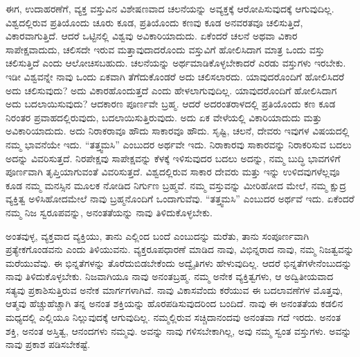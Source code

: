 ಈಗ, ಉದಾಹರಣೆಗೆ, ವ್ಯಕ್ತ ವಸ್ತುವಿನ ವಿಶೇಷಣವಾದ ಚಲನೆಯನ್ನು ಅವ್ಯಕ್ತಕ್ಕೆ ಆರೋಪಿಸುವುದಕ್ಕೆ ಆಗುವುದಿಲ್ಲ. ವಿಶ್ವದಲ್ಲಿರುವ ಪ್ರತಿಯೊಂದು ಚೂರು ಕೂಡ, ಪ್ರತಿಯೊಂದು ಕಣವು ಕೂಡ ಅನವರತವೂ ಚಲಿಸುತ್ತಿದೆ, ವಿಕಾರವಾಗುತ್ತಿದೆ. ಆದರೆ ಒಟ್ಟಿನಲ್ಲಿ ವಿಶ್ವವು ಅವಿಕಾರಿಯಾದುದು. ಏಕೆಂದರೆ ಚಲನೆ ಅಥವಾ ವಿಕಾರ ಸಾಪೇಕ್ಷವಾದುದು, ಚಲಿಸದೇ ಇರುವ ಮತ್ತಾವುದಾದರೊಂದು ವಸ್ತುವಿಗೆ ಹೋಲಿಸಿದಾಗ ಮಾತ್ರ ಒಂದು ವಸ್ತು ಚಲಿಸುತ್ತಿದೆ ಎಂದು ಆಲೋಚಿಸಬಹುದು. ಚಲನೆಯನ್ನು ಅರ್ಥಮಾಡಿಕೊಳ್ಳಬೇಕಾದರೆ ಎರಡು ವಸ್ತುಗಳು ಇರಬೇಕು. ಇಡೀ ವಿಶ್ವವನ್ನೇ ನಾವು ಒಂದು ಏಕವಾಗಿ ತೆಗೆದುಕೊಂಡರೆ ಅದು ಚಲಿಸಲಾರದು. ಯಾವುದರೊಂದಿಗೆ ಹೋಲಿಸಿದರೆ ಅದು ಚಲಿಸುವುದು? ಅದು ವಿಕಾರಹೊಂದುತ್ತದೆ ಎಂದು ಹೇಳಲಾಗುವುದಿಲ್ಲ. ಯಾವುದರೊಂದಿಗೆ ಹೋಲಿಸಿದಾಗ ಅದು ಬದಲಾಯಿಸುವುದು? ಆದಕಾರಣ ಪೂರ್ಣವೇ ಬ್ರಹ್ಮ. ಆದರೆ ಅದರಂತರಾಳದಲ್ಲಿ ಪ್ರತಿಯೊಂದು ಕಣ ಕೂಡ ನಿರಂತರ ಪ್ರವಾಹದಲ್ಲಿರುವುದು, ಬದಲಾಯಿಸುತ್ತಿರುವುದು. ಅದು ಏಕ ವೇಳೆಯಲ್ಲಿ ವಿಕಾರಿಯಾದುದು ಮತ್ತು ಅವಿಕಾರಿಯಾದುದು. ಅದು ನಿರಾಕರಾವೂ ಹೌದು ಸಾಕಾರವೂ ಹೌದು. ಸೃಷ್ಟಿ, ಚಲನೆ, ದೇವರು ಇವುಗಳ ವಿಷಯದಲ್ಲಿ ನಮ್ಮ ಭಾವನೆಯೇ ಇದು. “ತತ್ತ್ವಮಸಿ” ಎಂಬುದರ ಅರ್ಥವೇ ಇದು. ನಿರಾಕಾರವು ಸಾಕಾರವನ್ನು ನಿರಾಕರಿಸುವ ಬದಲು ಅದನ್ನು ವಿವರಿಸುತ್ತದೆ. ನಿರಪೇಕ್ಷವು ಸಾಪೇಕ್ಷವನ್ನು ಕೆಳಕ್ಕೆ ಇಳಿಸುವುದರ ಬದಲು ಅದನ್ನು, ನಮ್ಮ ಬುದ್ಧಿ ಭಾವಗಳಿಗೆ ಪೂರ್ಣವಾಗಿ ತೃಪ್ತಿಯಾಗುವಂತೆ ವಿವರಿಸುತ್ತದೆ. ವಿಶ್ವದಲ್ಲಿರುವ ಸಾಕಾರ ದೇವರು ಮತ್ತು ಇನ್ನು ಉಳಿದವುಗಳೆಲ್ಲವೂ ಕೂಡ ನಮ್ಮ ಮನಸ್ಸಿನ ಮೂಲಕ ನೋಡಿದ ನಿರ್ಗುಣ ಬ್ರಹ್ಮವೆ. ನಮ್ಮ ವಸ್ತುವನ್ನು ಮೀರಿಹೋದ ಮೇಲೆ, ನಮ್ಮ ಕ್ಷುದ್ರ ವ್ಯಕ್ತಿತ್ವ ಅಳಿಸಿಹೋದಮೇಲೆ ನಾವು ಬ್ರಹ್ಮನೊಂದಿಗೆ ಒಂದಾಗುವೆವು. “ತತ್ತ್ವಮಸಿ” ಎಂಬುದರ ಅರ್ಥವೆ ಇದು. ಏಕೆಂದರೆ ನಮ್ಮ ನಿಜ ಸ್ವರೂಪವನ್ನು, ಅನಂತತೆಯನ್ನು ನಾವು ತಿಳಿದುಕೊಳ್ಳಬೇಕು. 

ಅಂತವುಳ್ಳ, ವ್ಯಕ್ತವಾದ ವ್ಯಕ್ತಿಯು, ತಾನು ಎಲ್ಲಿಂದ ಬಂದೆ ಎಂಬುದನ್ನು ಮರೆತು, ತಾನು ಸಂಪೂರ್ಣವಾಗಿ ಪ್ರತ್ಯೇಕಗೊಂಡವನು ಎಂದು ತಿಳಿಯುವನು. ವ್ಯಕ್ತರೂಪಧಾರಣೆ ಮಾಡಿದ ನಾವು, ವಿಭಿನ್ನರಾದ ನಾವು, ನಮ್ಮ ನಿಜತ್ವವನ್ನು ಮರೆಯುವೆವು. ಈ ಭಿನ್ನತೆಗಳನ್ನು ತೊರೆದುಬಿಡಬೇಕೆಂದು ಅದ್ವೈತಿಗಳು ಹೇಳುವುದಿಲ್ಲ. ಆದರೆ ಭಿನ್ನತೆಗಳೇನೆಂಬುದನ್ನು ನಾವು ತಿಳಿದುಕೊಳ್ಳಬೇಕು. ನಿಜವಾಗಿಯೂ ನಾವು ಅನಂತಬ್ರಹ್ಮ. ನಮ್ಮ ಅನೇಕ ವ್ಯಕ್ತಿತ್ವಗಳು, ಆ ಅದ್ವಿತೀಯವಾದ ಸತ್ಯವು ಪ್ರಕಾಶಿಸುತ್ತಿರುವ ಅನೇಕ ಮಾರ್ಗಗಳಾಗಿವೆ. ನಾವು ವಿಕಾಸವೆಂದು ಕರೆಯುವ ಈ ಬದಲಾವಣೆಗಳ ಮೊತ್ತವು, ಆತ್ಮವು ಹೆಚ್ಚುಹೆಚ್ಚಾಗಿ ತನ್ನ ಅನಂತ ಶಕ್ತಿಯನ್ನು ಹೊರಪಡಿಸುವುದರಿಂದ ಬಂದಿದೆ. ನಾವು ಈ ಅನಂತತೆಯ ಕಡಲಿನ ಮಧ್ಯದಲ್ಲಿ ಎಲ್ಲಿಯೂ ನಿಲ್ಲುವುದಕ್ಕೆ ಆಗುವುದಿಲ್ಲ. ನಮ್ಮಲ್ಲಿರುವ ಸಚ್ಚಿದಾನಂದವು ಅನಂತವಾ ಗದೆ ಇರದು. ಅನಂತ ಶಕ್ತಿ, ಅನಂತ ಅಸ್ತಿತ್ವ, ಆನಂದಗಳು ನಮ್ಮವು. ಅವನ್ನು ನಾವು ಗಳಿಸಬೇಕಾಗಿಲ್ಲ, ಅವು ನಮ್ಮ ಸ್ವಂತ ವಸ್ತುಗಳು. ಅವನ್ನು ನಾವು ಪ್ರಕಾಶ ಪಡಿಸಬೇಕಷ್ಟೆ. 

